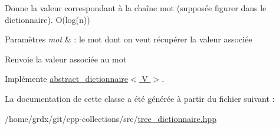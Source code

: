 Donne la valeur correspondant à la chaîne mot (supposée figurer dans le dictionnaire). O(log(n)) 


\begin{DoxyParams}{Paramètres}
{\em mot} & \-: le mot dont on veut récupérer la valeur associée \\
\hline
\end{DoxyParams}
\begin{DoxyReturn}{Renvoie}
la valeur associée au mot 
\end{DoxyReturn}


Implémente \hyperlink{classabstract__dictionnaire_abf2426d66e5499582dc4dc4fe5eeb1c3}{abstract\-\_\-dictionnaire$<$ V $>$}.



La documentation de cette classe a été générée à partir du fichier suivant \-:\begin{DoxyCompactItemize}
\item 
/home/grdx/git/cpp-\/collections/src/\hyperlink{tree__dictionnaire_8hpp}{tree\-\_\-dictionnaire.\-hpp}\end{DoxyCompactItemize}
